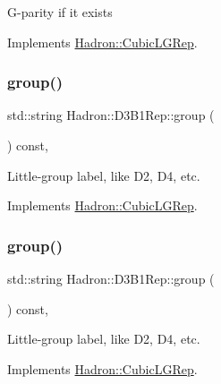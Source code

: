 G-\/parity if it exists 

Implements \mbox{\hyperlink{structHadron_1_1CubicLGRep_ace26f7b2d55e3a668a14cb9026da5231}{Hadron\+::\+Cubic\+L\+G\+Rep}}.

\mbox{\label{structHadron_1_1D3B1Rep_a2a200d92b086e79b44d9df923fa30fb4}} 
\subsubsection{\texorpdfstring{group()}{group()}\hspace{0.1cm}{\footnotesize\ttfamily [1/5]}}
{\footnotesize\ttfamily std\+::string Hadron\+::\+D3\+B1\+Rep\+::group (\begin{DoxyParamCaption}{ }\end{DoxyParamCaption}) const\hspace{0.3cm}{\ttfamily [inline]}, {\ttfamily [virtual]}}

Little-\/group label, like D2, D4, etc. 

Implements \mbox{\hyperlink{structHadron_1_1CubicLGRep_a9bdb14b519a611d21379ed96a3a9eb41}{Hadron\+::\+Cubic\+L\+G\+Rep}}.

\mbox{\label{structHadron_1_1D3B1Rep_a2a200d92b086e79b44d9df923fa30fb4}} 
\subsubsection{\texorpdfstring{group()}{group()}\hspace{0.1cm}{\footnotesize\ttfamily [2/5]}}
{\footnotesize\ttfamily std\+::string Hadron\+::\+D3\+B1\+Rep\+::group (\begin{DoxyParamCaption}{ }\end{DoxyParamCaption}) const\hspace{0.3cm}{\ttfamily [inline]}, {\ttfamily [virtual]}}

Little-\/group label, like D2, D4, etc. 

Implements \mbox{\hyperlink{structHadron_1_1CubicLGRep_a9bdb14b519a611d21379ed96a3a9eb41}{Hadron\+::\+Cubic\+L\+G\+Rep}}.

\mbox{\label{structHadron_1_1D3B1Rep_a2a200d92b086e79b44d9df923fa30fb4}} 
